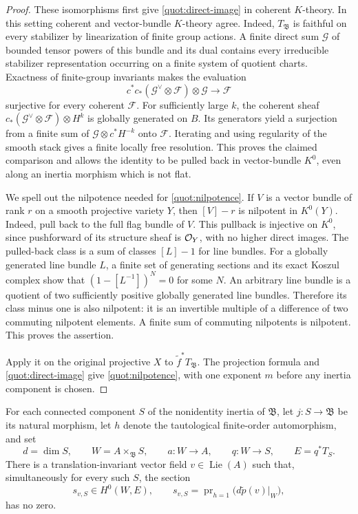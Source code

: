 \begin{proof}
These isomorphisms first give \eqref{quot:direct-image} in coherent
\(K\)-theory.  In this setting coherent and vector-bundle \(K\)-theory
agree.  Indeed, \(T_{\mathfrak B}\) is faithful on every stabilizer by
linearization of finite group actions.  A finite direct sum
\(\mathcal G\) of bounded tensor powers of this bundle and its dual
contains every irreducible stabilizer representation occurring on a
finite system of quotient charts.  Exactness of finite-group
invariants makes the evaluation
\[
 c^*c_*(\mathcal G^\vee\otimes\mathcal F)\otimes\mathcal G
                          \longrightarrow\mathcal F
\]
surjective for every coherent \(\mathcal F\).  For sufficiently large
\(k\), the coherent sheaf
\(c_*(\mathcal G^\vee\otimes\mathcal F)\otimes H^k\) is globally
generated on \(B\).  Its generators yield a surjection from a finite
sum of \(\mathcal G\otimes c^*H^{-k}\) onto \(\mathcal F\).
Iterating and using regularity of the smooth stack gives a finite
locally free resolution.  This proves the claimed comparison and
allows the identity to be pulled back in vector-bundle \(K^0\), even
along an inertia morphism which is not flat.

We spell out the nilpotence needed for
\eqref{quot:nilpotence}.  If \(V\) is a vector bundle of rank \(r\) on
a smooth projective variety \(Y\), then \([V]-r\) is nilpotent in
\(K^0(Y)\).  Indeed, pull back to the full flag bundle of \(V\).
This pullback is injective on \(K^0\), since pushforward of its
structure sheaf is \(\mathcal O_Y\), with no higher direct images.
The pulled-back class is a sum of classes \([L]-1\) for line bundles.
For a globally generated line bundle \(L\), a finite set of generating
sections and its exact Koszul complex show that
\((1-[L^{-1}])^N=0\) for some \(N\).
An arbitrary line bundle is a quotient of two sufficiently positive
globally generated line bundles.  Therefore its class minus one is
also nilpotent: it is an invertible multiple of a difference of two
commuting nilpotent elements.  A finite sum of commuting nilpotents is
nilpotent.  This proves the assertion.

Apply it on the original projective \(X\) to
\(\widetilde f^*T_{\mathfrak B}\).
The projection formula and \eqref{quot:direct-image} give
\eqref{quot:nilpotence}, with one exponent \(m\) before any inertia
component is chosen.
\end{proof}

\begin{lemma}
\label{quot:translation-field}
For each connected component \(S\) of the nonidentity inertia of
\(\mathfrak B\), let \(j:S\to\mathfrak B\) be its natural morphism,
let \(h\) denote the tautological finite-order automorphism, and set
\[
 d=\dim S,\qquad
 W=A\times_{\mathfrak B}S,\qquad
 a:W\to A,\qquad q:W\to S,\qquad E=q^*T_S .
\]
There is a translation-invariant vector field
\(v\in\operatorname{Lie}(A)\) such that, simultaneously for every such
\(S\), the section
\begin{equation}\label{quot:projected-section}
 s_{v,S}\in H^0(W,E),\qquad
 s_{v,S}=\operatorname{pr}_{h=1}\bigl(d\widetilde p(v)|_W\bigr),
\end{equation}
has no zero.
\end{lemma}

